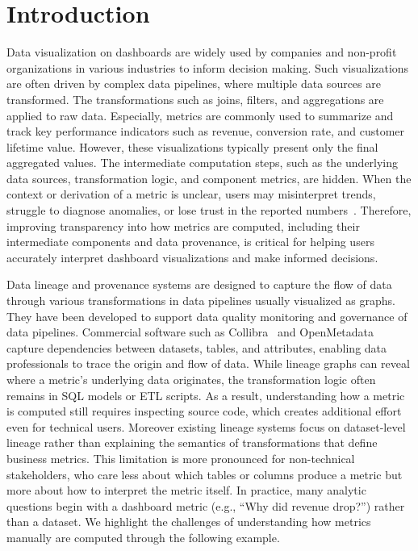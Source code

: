 
\section{Introduction} 
Data visualization on dashboards are widely used by companies and non-profit
organizations in various industries to inform decision making. Such
visualizations are often driven by complex data pipelines, where multiple data
sources are transformed. The transformations such as joins, filters, and
aggregations are applied to raw data. 
Especially, metrics are commonly used to summarize and track key performance
indicators such as revenue, conversion rate, and customer lifetime value.
However, these visualizations typically present only the final aggregated
values. The intermediate computation steps, such as the underlying data sources,
transformation logic, and component metrics, are hidden. When the context or
derivation of a metric is unclear, users may misinterpret trends, struggle to
diagnose anomalies, or lose trust in the reported numbers~\cite{}. Therefore,
improving transparency into how metrics are computed, including their
intermediate components and data provenance, is critical for helping users
accurately interpret dashboard visualizations and make informed decisions.


Data lineage and provenance systems are designed to capture the flow of data
through various transformations in data pipelines usually visualized as graphs.
They have been developed to support data quality monitoring and governance of
data pipelines. Commercial software such as Collibra~\cite{} and
OpenMetadata~\cite{} capture dependencies between datasets, tables, and
attributes, enabling data professionals to trace the origin and flow of data.
While lineage graphs can reveal where a metric's underlying data originates, the
transformation logic often remains in SQL models or ETL scripts. As a result,
understanding how a metric is computed still requires inspecting source code,
which creates additional effort even for technical users. Moreover existing
lineage systems focus on dataset-level lineage rather than explaining the
semantics of transformations that define business metrics. This limitation is
more pronounced for non-technical stakeholders, who care less about which tables
or columns produce a metric but more about how to interpret the metric itself.
In practice, many analytic questions begin with a dashboard metric (e.g., ``Why
did revenue drop?'') rather than a dataset.
% 
We highlight the challenges of understanding how metrics manually are computed
through the following example.

